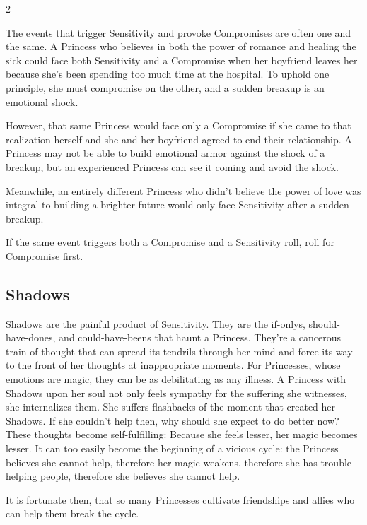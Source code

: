 \begin{multicols}{2}
\begin{mybox}
The events that trigger Sensitivity and provoke Compromises are often one and the same. A Princess who believes in both the power of romance and healing the sick could face both Sensitivity and a Compromise when her boyfriend leaves her because she's been spending too much time at the hospital. To uphold one principle, she must compromise on the other, and a sudden breakup is an emotional shock.

However, that same Princess would face only a Compromise if she came to that realization herself and she and her boyfriend agreed to end their relationship. A Princess may not be able to build emotional armor against the shock of a breakup, but an experienced Princess can see it coming and avoid the shock. 

Meanwhile, an entirely different Princess who didn't believe the power of love was integral to building a brighter future would only face Sensitivity after a sudden breakup.

If the same event triggers both a Compromise and a Sensitivity roll, roll for Compromise first.

\end{mybox}

\subsection*{Shadows} 
\label{subsec:Shadows} 

Shadows are the painful product of Sensitivity. They are the if-onlys, should-have-dones, and could-have-beens that haunt a Princess. They're a cancerous train of thought that can spread its tendrils through her mind and force its way to the front of her thoughts at inappropriate moments. For Princesses, whose emotions are magic, they can be as debilitating as any illness. A Princess with Shadows upon her soul not only feels sympathy for the suffering she witnesses, she internalizes them. She suffers flashbacks of the moment that created her Shadows. If she couldn’t help then, why should she expect to do better now? These thoughts become self-fulfilling: Because she feels lesser, her magic becomes lesser. It can too easily become the beginning of a vicious cycle: the Princess believes she cannot help, therefore her magic weakens, therefore she has trouble helping people, therefore she believes she cannot help.

It is fortunate then, that so many Princesses cultivate friendships and allies who can help them break the cycle.


\end{multicols}

